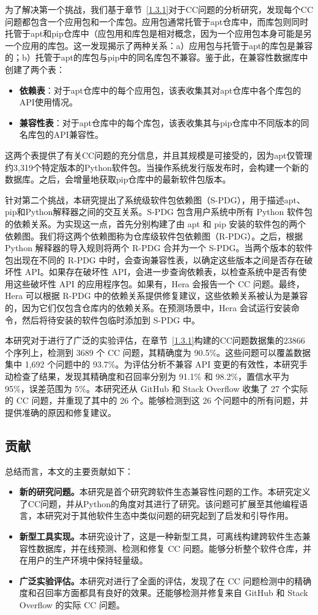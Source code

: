 为了解决第一个挑战，我们基于章节~\ref{1.3.1}对于CC问题的分析研究，发现每个CC问题都包含一个应用包和一个库包。应用包通常托管于apt仓库中，而库包则同时托管于apt和pip仓库中（应包用和库包是相对概念，因为一个应用包本身可能是另一个应用的库包。这一发现揭示了两种关系：a）应用包与托管于apt的库包是兼容的；b）托管于apt的库包与pip中的同名库包不兼容。鉴于此，\tool{}在兼容性数据库中创建了两个表：
\begin{itemize}
	\item \textbf{依赖表}：对于apt仓库中的每个应用包，该表收集其对apt仓库中各个库包的API使用情况。
	\item\textbf{兼容性表}：对于apt仓库中的每个库包，该表收集其与pip仓库中不同版本的同名库包的API兼容性。
\end{itemize}
这两个表提供了有关CC问题的充分信息，并且其规模是可接受的，因为apt仅管理约3,319个特定版本的Python软件包。当操作系统发行版发布时，\tool{}会构建一个新的数据库。之后，\tool{}会增量地获取pip仓库中的最新软件包版本。

针对第二个挑战，本研究提出了系统级软件包依赖图（S-PDG），用于描述apt、pip和Python解释器之间的交互关系。S-PDG 包含用户系统中所有 Python 软件包的依赖关系。为实现这一点，\tool{}首先分别构建了由 apt 和 pip 安装的软件包的两个依赖图。我们将这两个依赖图称为仓库级软件包依赖图（R-PDG）。之后，\tool{}根据 Python 解释器的导入规则将两个 R-PDG 合并为一个 S-PDG。当两个版本的软件包出现在不同的 R-PDG 中时，\tool{}会查询兼容性表，以确定这些版本之间是否存在破坏性 API。如果存在破坏性 API，\tool{}会进一步查询依赖表，以检查系统中是否有使用这些破坏性 API 的应用程序包。如果有，Hera 会报告一个 CC 问题。最终，Hera 可以根据 R-PDG 中的依赖关系提供修复建议，这些依赖关系被认为是兼容的，因为它们仅包含仓库内的依赖关系。在预测场景中，Hera 会试运行安装命令，然后将待安装的软件包临时添加到 S-PDG 中。

本研究对于\tool{}进行了广泛的实验评估，在章节~\ref{1.3.1}构建的CC问题数据集的23866个序列上，\tool{}检测到 3689 个 CC 问题，其精确度为 90.5\%。这些问题可以覆盖数据集中 1,692 个问题中的 93.7\%。为评估分析不兼容 API 变更的有效性，本研究手动检查了结果，发现其精确度和召回率分别为 91.1\% 和 98.2\%，置信水平为 95\%，误差范围为 5\%。本研究还从 GitHub 和 Stack Overflow 收集了 27 个实际的 CC 问题，并重现了其中的 26 个。\tool{}能够检测到这 26 个问题中的所有问题，并提供准确的原因和修复建议。
\subsection{贡献}
总结而言，本文的主要贡献如下： 
\begin{itemize}
	\item \textbf{新的研究问题。}本研究是首个研究跨软件生态兼容性问题的工作。本研究定义了CC问题，并从Python的角度对其进行了研究。该问题可扩展至其他编程语言，本研究对于其他软件生态中类似问题的研究起到了启发和引导作用。
	\item \textbf{新型工具实现。}本研究设计了\tool{}，这是一种新型工具，可离线构建跨软件生态兼容性数据库，并在线预测、检测和修复 CC 问题。\tool{}能够分析整个软件仓库，并在用户的生产环境中保持轻量级。
	\item \textbf{广泛实验评估。}本研究对\tool{}进行了全面的评估，发现了\tool{}在 CC 问题检测中的精确度和召回率方面都具有良好的效果。\tool{}还能够检测并修复来自 GitHub 和 Stack Overflow 的实际 CC 问题。
\end{itemize}
